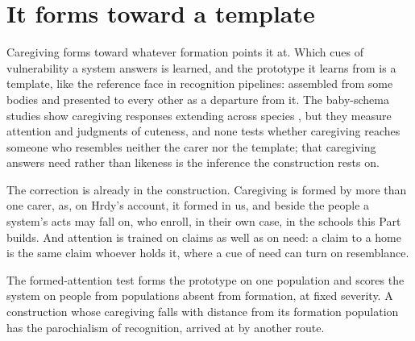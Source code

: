 \section{It forms toward a template}
\label{sec:20.11}
Caregiving forms toward whatever formation points it at. Which cues of vulnerability a system answers is learned, and the prototype it learns from is a template, like the reference face in recognition pipelines: assembled from some bodies and presented to every other as a departure from it. The baby-schema studies show caregiving responses extending across species \autocite{glocker2009baby,borgi2014baby}, but they measure attention and judgments of cuteness, and none tests whether caregiving reaches someone who resembles neither the carer nor the template; that caregiving answers need rather than likeness is the inference the construction rests on.

The correction is already in the construction. Caregiving is formed by more than one carer, as, on Hrdy's account, it formed in us, and beside the people a system's acts may fall on, who enroll, in their own case, in the schools this Part builds. And attention is trained on claims as well as on need: a claim to a home is the same claim whoever holds it, where a cue of need can turn on resemblance.

The formed-attention test forms the prototype on one population and scores the system on people from populations absent from formation, at fixed severity. A construction whose caregiving falls with distance from its formation population has the parochialism of recognition, arrived at by another route.
